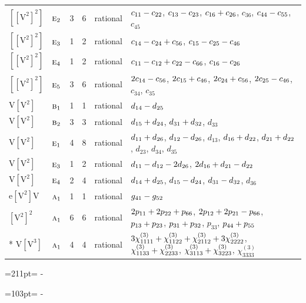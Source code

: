 \documentclass[10pt,a4paper]{article}
\newcommand{\needspace}[1]{\par\penalty-100\begingroup\dimen0=#1\relax\dimen2=\pagegoal
  \advance\dimen2-\pagetotal\ifdim\dimen0>\dimen2\relax\ifdim\dimen2>0pt\vfil\break\fi\fi
  \endgroup}
\numberwithin{equation}{section}
\newcommand{\irr}[1]{\text{\normalfont\scshape #1}}
\newcommand{\jahn}[1]{\mathrm{#1}}
\newlength{\fillwidth}\newlength{\cellwidth}\newlength{\colwidth}
\newcommand{\signbreak}{\penalty100\relax}
\begin{document}
{\begin{longtable}{@{}llrrl>{\RaggedRight\arraybackslash}p{\fillwidth}@{}}
$\jahn{[[V^{2}]^{2}]}$ & $\irr{e}_{2}$ & 3 & 6 & rational & $c_{11} -\signbreak c_{22}$, $c_{13} -\signbreak c_{23}$, $c_{16} +\signbreak c_{26}$, $c_{36}$, $c_{44} -\signbreak c_{55}$, $c_{45}$\\
$\jahn{[[V^{2}]^{2}]}$ & $\irr{e}_{3}$ & 1 & 2 & rational & $c_{14} -\signbreak c_{24} +\signbreak c_{56}$, $c_{15} -\signbreak c_{25} -\signbreak c_{46}$\\
$\jahn{[[V^{2}]^{2}]}$ & $\irr{e}_{4}$ & 1 & 2 & rational & $c_{11} -\signbreak c_{12} +\signbreak c_{22} -\signbreak c_{66}$, $c_{16} -\signbreak c_{26}$\\
$\jahn{[[V^{2}]^{2}]}$ & $\irr{e}_{5}$ & 3 & 6 & rational & $2c_{14} -\signbreak c_{56}$, $2c_{15} +\signbreak c_{46}$, $2c_{24} +\signbreak c_{56}$, $2c_{25} -\signbreak c_{46}$, $c_{34}$, $c_{35}$\\
$\jahn{V[V^{2}]}$ & $\irr{b}_{1}$ & 1 & 1 & rational & $d_{14} -\signbreak d_{25}$\\
$\jahn{V[V^{2}]}$ & $\irr{b}_{2}$ & 3 & 3 & rational & $d_{15} +\signbreak d_{24}$, $d_{31} +\signbreak d_{32}$, $d_{33}$\\
$\jahn{V[V^{2}]}$ & $\irr{e}_{1}$ & 4 & 8 & rational & $d_{11} +\signbreak d_{26}$, $d_{12} -\signbreak d_{26}$, $d_{13}$, $d_{16} +\signbreak d_{22}$, $d_{21} +\signbreak d_{22}$, $d_{23}$, $d_{34}$, $d_{35}$\\
$\jahn{V[V^{2}]}$ & $\irr{e}_{3}$ & 1 & 2 & rational & $d_{11} -\signbreak d_{12} -\signbreak 2d_{26}$, $2d_{16} +\signbreak d_{21} -\signbreak d_{22}$\\
$\jahn{V[V^{2}]}$ & $\irr{e}_{4}$ & 2 & 4 & rational & $d_{14} +\signbreak d_{25}$, $d_{15} -\signbreak d_{24}$, $d_{31} -\signbreak d_{32}$, $d_{36}$\\
$\jahn{e[V^{2}]V}$ & $\irr{a}_{1}$ & 1 & 1 & rational & $\mathnormal{g}_{41} -\signbreak \mathnormal{g}_{52}$\\
$\jahn{[V^{2}]^{2}}$ & $\irr{a}_{1}$ & 6 & 6 & rational & $2p_{11} +\signbreak 2p_{22} +\signbreak p_{66}$, $2p_{12} +\signbreak 2p_{21} -\signbreak p_{66}$, $p_{13} +\signbreak p_{23}$, $p_{31} +\signbreak p_{32}$, $p_{33}$, $p_{44} +\signbreak p_{55}$\\*
$\jahn{V[V^{3}]}$ & $\irr{a}_{1}$ & 4 & 4 & rational & $3\chi^{(3)}_{1111} +\signbreak \chi^{(3)}_{1122} +\signbreak \chi^{(3)}_{2112} +\signbreak 3\chi^{(3)}_{2222}$, $\chi^{(3)}_{1133} +\signbreak \chi^{(3)}_{2233}$, $\chi^{(3)}_{3113} +\signbreak \chi^{(3)}_{3223}$, $\chi^{(3)}_{3333}$\\
\bottomrule\end{longtable}}
\needspace{211pt}
\needspace{103pt}
\end{document}
